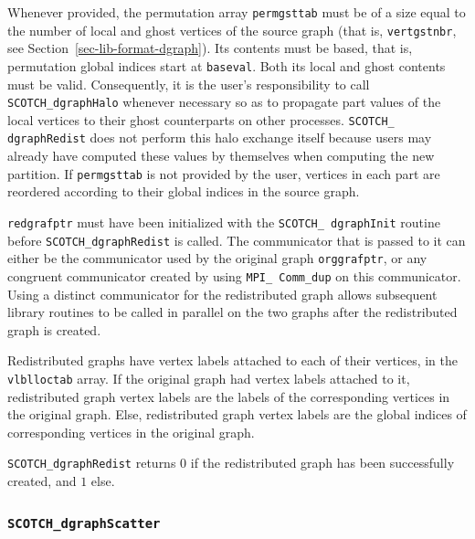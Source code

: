 \begin{itemize}
Whenever provided, the permutation array {\tt perm\lbt gst\lbt tab}
must be of a size equal to the number of local and ghost vertices of
the source graph (that is, {\tt vert\lbt gst\lbt nbr}, see
Section~\ref{sec-lib-format-dgraph}). Its contents must be based, that
is, permutation global indices start at {\tt baseval}. Both its local
and ghost contents must be valid. Consequently, it is the user's
responsibility to call {\tt SCOTCH\_dgraph\lbt Halo} whenever
necessary so as to propagate part values of the local vertices to
their ghost counterparts on other processes. {\tt SCOTCH\_\lbt
dgraph\lbt Redist} does not perform this halo exchange itself
because users may already have computed these values by themselves
when computing the new partition. If {\tt perm\lbt gst\lbt tab} is not
provided by the user, vertices in each part are reordered according to
their global indices in the source graph.

{\tt redgrafptr} must have been initialized with the {\tt SCOTCH\_\lbt
dgraph\lbt Init} routine before {\tt SCOTCH\_dgraph\lbt Redist} is
called. The communicator that is passed to it can either be the
communicator used by the original graph {\tt org\lbt graf\lbt ptr},
or any congruent communicator created by using {\tt MPI\_\lbt
Comm\_\lbt dup} on this communicator. Using a distinct communicator
for the redistributed graph allows subsequent library routines to be
called in parallel on the two graphs after the redistributed graph is
created.

Redistributed graphs have vertex labels attached to each of their
vertices, in the {\tt vlbl\lbt loc\lbt tab} array. If the original
graph had vertex labels attached to it, redistributed graph vertex
labels are the labels of the corresponding vertices in the original
graph. Else, redistributed graph vertex labels are the global indices
of corresponding vertices in the original graph.

\progret

{\tt SCOTCH\_dgraphRedist} returns $0$ if the redistributed graph has
been successfully created, and $1$ else.
\end{itemize}

\subsubsection{{\tt SCOTCH\_dgraphScatter}}

